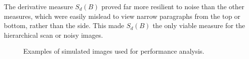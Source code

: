 The derivative measure $S_d(B)$ proved far more resilient to noise than the
other measures, which were easily mislead to view narrow paragraphs from the
top or bottom, rather than the side.
This made $S_d(B)$ the only viable measure for the hierarchical scan or noisy
images.

\begin{comment}
The entropy measure $E(B)$ performed significantly worse in all the above
measures.  $S(B)$ and $S_d(B)$ always responded well with the $S(B)$ measure
deteriorating rapidly as the image became noisier. CHECK JOEY.  $S_d(B)$
responded best even in presence of noise and is also more efficient to compute.
The confidence of each of the vanishing points with regard to the binarised text
in \reffig{runbin} is plotted in \reffig{ppmap}, where darker pixels represent a
larger squared-sum, and a more likely vanishing point.
\end{comment}


\begin{figure}[t!]
\centering
\begin{center}
\hspace*{3mm}
\hspace*{3mm}
\end{center}
\vspace*{0mm}
\caption{Examples of simulated images used for performance analysis.}
\label{simimages}
\end{figure}

